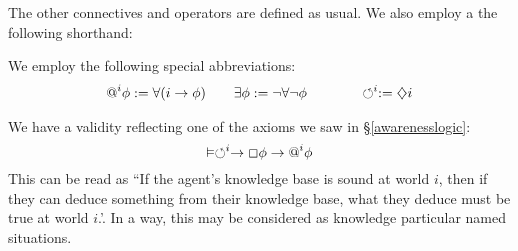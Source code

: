 The other connectives and operators are defined as usual. We also employ a
the following shorthand:

\begin{notation}
  We employ the following special abbreviations:
  \begin{eqnarray}
    \text{{\upshape{@}}}^i \phi := \forall (i \rightarrow \phi)
    \hspace{2em} & \exists \phi := \neg \forall \neg \phi \hspace{3em} &
    \circlearrowleft^i := \diamondsuit i \nonumber
  \end{eqnarray}
\end{notation}

We have a validity reflecting one of the axioms we saw in
{\S}\ref{awarenesslogic}:
\[ \vDash \circlearrowleft^i \rightarrow \Box \phi \rightarrow
   \text{{\upshape{@}}}^i \phi \]
This can be read as ``If the agent's knowledge base is sound at world $i$,
then if they can deduce something from their knowledge base, what they deduce
must be true at world $i$.'.  In a way, this may be considered as
{} knowledge particular named situations.




